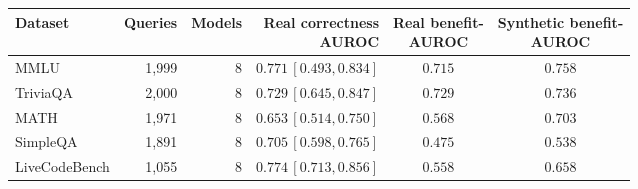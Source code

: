 \begin{tabular}{lrrrcc}
\toprule
Dataset & Queries & Models & \shortstack{Real correctness\\AUROC} & \shortstack{Real benefit-\\AUROC} & \shortstack{Synthetic benefit-\\AUROC} \\
\midrule
MMLU & 1,999 & 8 & $0.771\,[0.493,0.834]$ & $0.715$ & $0.758$ \\
TriviaQA & 2,000 & 8 & $0.729\,[0.645,0.847]$ & $0.729$ & $0.736$ \\
MATH & 1,971 & 8 & $0.653\,[0.514,0.750]$ & $0.568$ & $0.703$ \\
SimpleQA & 1,891 & 8 & $0.705\,[0.598,0.765]$ & $0.475$ & $0.538$ \\
LiveCodeBench & 1,055 & 8 & $0.774\,[0.713,0.856]$ & $0.558$ & $0.658$ \\
\bottomrule
\end{tabular}
